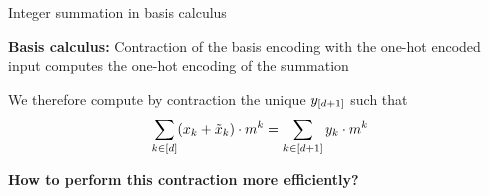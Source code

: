 \documentclass{beamer}
\begin{document}
    \begin{frame}{Integer summation in basis calculus}
        \par
        {\bf Basis calculus:} Contraction of the basis encoding with the one-hot encoded input computes the one-hot encoding of the summation
        
        We therefore compute by contraction the unique $y_{[d+1]}$ such that
        \begin{align*}
            \sum_{k\in[d]} (x_{k}+\tilde{x}_{k}) \cdot m^{k}
            = \sum_{k\in[d+1]} y_{k} \cdot m^{k}
        \end{align*}

        \begin{center}
            \bf How to perform this contraction more efficiently?
        \end{center}
    \end{frame}
\end{document}
